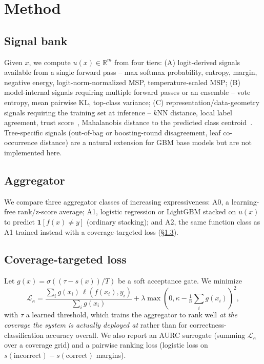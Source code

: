 \documentclass[conference]{IEEEtran}
\begin{document}
\section{Method}
\label{sec:method}

\subsection{Signal bank}
Given $x$, we compute $u(x) \in \mathbb{R}^m$ from four tiers: (A)
logit-derived signals available from a single forward pass -- max softmax
probability, entropy, margin, negative energy, logit-norm-normalized MSP,
temperature-scaled MSP; (B) model-internal signals requiring multiple
forward passes or an ensemble -- vote entropy, mean pairwise KL, top-class
variance; (C) representation/data-geometry signals requiring the training
set at inference -- $k$NN distance, local label agreement, trust
score~\cite{jiang2018trustscore}, Mahalanobis distance to the predicted
class centroid~\cite{lee2018mahalanobis}. Tree-specific signals
(out-of-bag or boosting-round disagreement, leaf co-occurrence distance)
are a natural extension for GBM base models but are not implemented here.

\subsection{Aggregator}
We compare three aggregator classes of increasing expressiveness: A0, a
learning-free rank/z-score average; A1, logistic regression or LightGBM
stacked on $u(x)$ to predict $\mathbf{1}[f(x)\neq y]$ (ordinary stacking);
and A2, the same function class as A1 trained instead with a
coverage-targeted loss (\S\ref{sec:loss}).

\subsection{Coverage-targeted loss}
\label{sec:loss}
Let $g(x) = \sigma((\tau - s(x))/T)$ be a soft acceptance gate. We
minimize
\begin{equation}
\mathcal{L}_\kappa = \frac{\sum_i g(x_i)\,\ell(f(x_i),y_i)}{\sum_i g(x_i)}
  + \lambda \max(0, \kappa - \tfrac{1}{n}\textstyle\sum_i g(x_i))^2,
\end{equation}
with $\tau$ a learned threshold, which trains the aggregator to rank well
\emph{at the coverage the system is actually deployed at} rather than for
correctness-classification accuracy overall. We also report an AURC
surrogate (summing $\mathcal{L}_\kappa$ over a coverage grid) and a
pairwise ranking loss (logistic loss on $s(\text{incorrect}) -
s(\text{correct})$ margins).
\end{document}
